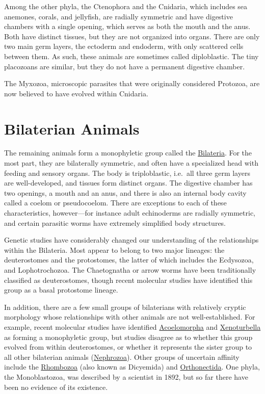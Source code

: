 Among the other phyla, the Ctenophora and the Cnidaria, which includes
sea anemones, corals, and jellyfish, are radially symmetric and have
digestive chambers with a single opening, which serves as both the mouth
and the anus. Both have distinct tissues, but they are not organized
into organs. There are only two main germ layers, the ectoderm and
endoderm, with only scattered cells between them. As such, these animals
are sometimes called diploblastic. The tiny placozoans are similar, but
they do not have a permanent digestive chamber.

The Myxozoa, microscopic parasites that were originally considered
Protozoa, are now believed to have evolved within Cnidaria.

\section{Bilaterian Animals}\label{bilaterian-animals}

The remaining animals form a monophyletic group called the \href{https://en.wikipedia.org/wiki/Bilateria}{Bilateria}.
For the most part, they are bilaterally symmetric, and often have a
specialized head with feeding and sensory organs. The body is
triploblastic, i.e.~all three germ layers are well-developed, and
tissues form distinct organs. The digestive chamber has two openings, a
mouth and an anus, and there is also an internal body cavity called a
coelom or pseudocoelom. There are exceptions to each of these
characteristics, however---for instance adult echinoderms are radially
symmetric, and certain parasitic worms have extremely simplified body
structures.

Genetic studies have considerably changed our understanding of the
relationships within the Bilateria. Most appear to belong to two major
lineages: the deuterostomes and the protostomes, the latter of which
includes the Ecdysozoa, and Lophotrochozoa. The Chaetognatha or arrow
worms have been traditionally classified as deuterostomes, though recent
molecular studies have identified this group as a basal protostome
lineage.

In addition, there are a few small groups of bilaterians with relatively
cryptic morphology whose relationships with other animals are not
well-established. For example, recent molecular studies have identified
\href{https://en.wikipedia.org/wiki/Acoelomorpha}{Acoelomorpha} and \href{https://en.wikipedia.org/wiki/Xenoturbella}{Xenoturbella} as forming a monophyletic group, but
studies disagree as to whether this group evolved from within
deuterostomes, or whether it represents the sister group to all other
bilaterian animals (\href{https://en.wikipedia.org/wiki/Nephrozoa}{Nephrozoa}). Other groups of uncertain affinity
include the \href{https://en.wikipedia.org/wiki/Dicyemida}{Rhombozoa} (also known as Dicyemida) and \href{https://en.wikipedia.org/wiki/Orthonectida}{Orthonectida}. One phyla, the Monoblastozoa,
was described by a scientist in 1892, but so far there have been no
evidence of its existence.

